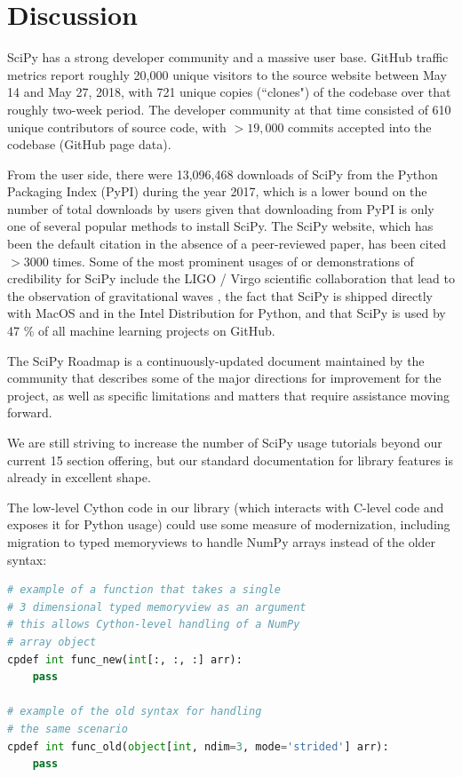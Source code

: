 \documentclass[fleqn,10pt]{wlscirep}
\begin{document}
\section*{Discussion}


SciPy has a strong developer community and a massive user base. GitHub traffic
metrics report roughly 20,000 unique visitors to the source website between May
14 and May 27, 2018, with 721 unique copies (``clones") of the codebase over
that roughly two-week period. The developer community at that time consisted of 610 unique
contributors of source code, with $>19,000$ commits accepted into the codebase
(GitHub page data).

From the user side, there were 13,096,468 downloads of SciPy from the Python
Packaging Index (PyPI) during the year 2017\cite{pypinfo}, which is a lower
bound on the number of total downloads by users given that downloading from
PyPI is only one of several popular methods to install SciPy.  The SciPy
website\cite{SciPylib}, which has been the default citation in the absence of a
peer-reviewed paper, has been cited $>3000$ times. Some of the most prominent
usages of or demonstrations of credibility for SciPy include the LIGO / Virgo
scientific collaboration that lead to the observation of gravitational waves
\cite{PhysRevLett.116.061102}, the fact that SciPy is shipped directly with
MacOS and in the Intel Distribution for Python\cite{intel-python}, and that SciPy is used
by 47 \% of all machine learning projects on GitHub\cite{octoverse-scipy}.

The SciPy Roadmap\cite{SciPy_roadmap_1,SciPy_roadmap_dev} is a
continuously-updated document
maintained by the community that describes some of the major directions for
improvement for the project, as well as specific limitations and matters that
require assistance moving forward.

We are still striving to increase the number of SciPy usage tutorials beyond
our current 15 section offering\cite{SciPy_tutorials}, but our standard
documentation for library features is already in excellent shape.

The low-level Cython code in our library (which interacts with C-level code and
exposes it for Python usage) could use some measure of modernization, including
migration to typed memoryviews to handle NumPy arrays instead of the older
syntax:

\begin{lstlisting}[language=Python]
# example of a function that takes a single
# 3 dimensional typed memoryview as an argument
# this allows Cython-level handling of a NumPy
# array object
cpdef int func_new(int[:, :, :] arr):
    pass

# example of the old syntax for handling
# the same scenario
cpdef int func_old(object[int, ndim=3, mode='strided'] arr):
    pass
\end{lstlisting}
\end{document}
